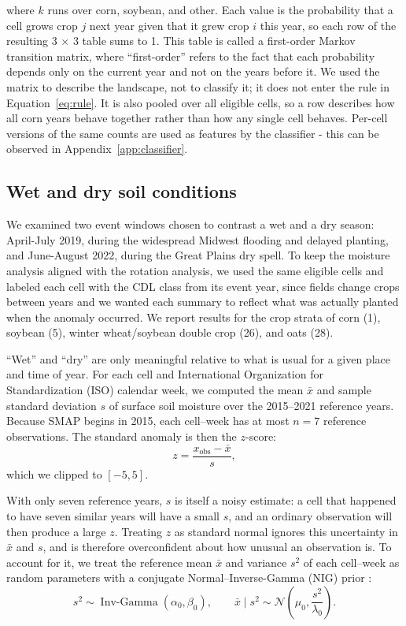 \documentclass[10pt,letterpaper]{article}
\begin{document}
where $k$ runs over corn, soybean, and other. Each value is the probability that a cell grows crop $j$ next year given that it grew crop $i$ this year, so each row of the resulting 3 $\times$ 3 table sums to 1. This table is called a first-order Markov transition matrix, where ``first-order'' refers to the fact that each probability depends only on the current year and not on the years before it. We used the matrix to describe the landscape, not to classify it; it does not enter the rule in Equation~\ref{eq:rule}. It is also pooled over all eligible cells, so a row describes how all corn years behave together rather than how any single cell behaves. Per-cell versions of the same counts are used as features by the classifier - this can be observed in Appendix~\ref{app:classifier}.

\subsection{Wet and dry soil conditions}\label{sec:method-moisture}

We examined two event windows chosen to contrast a wet and a dry season: April-July 2019, during the widespread Midwest flooding and delayed planting, and June-August 2022, during the Great Plains dry spell. To keep the moisture analysis aligned with the rotation analysis, we used the same eligible cells and labeled each cell with the CDL class from its event year, since fields change crops between years and we wanted each summary to reflect what was actually planted when the anomaly occurred. We report results for the crop strata of corn (1), soybean (5), winter wheat/soybean double crop (26), and oats (28).

``Wet'' and ``dry'' are only meaningful relative to what is usual for a given place and time of year. For each cell and International Organization for Standardization (ISO) calendar week, we computed the mean $\bar{x}$ and sample standard deviation $s$ of surface soil moisture over the 2015--2021 reference years. Because SMAP begins in 2015, each cell--week has at most $n=7$ reference observations. The standard anomaly is then the $z$-score:
\begin{equation}
z=\frac{x_{\mathrm{obs}}-\bar{x}}{s},
\label{eq:z}
\end{equation}
which we clipped to $[-5,5]$.

With only seven reference years, $s$ is itself a noisy estimate: a cell that happened to have seven similar years will have a small $s$, and an ordinary observation will then produce a large $z$. Treating $z$ as standard normal ignores this uncertainty in $\bar{x}$ and $s$, and is therefore overconfident about how unusual an observation is. To account for it, we treat the reference mean $\bar{x}$ and variance $s^2$ of each cell--week as random parameters with a conjugate Normal--Inverse-Gamma (NIG) prior \citep{murphy2007conjugate}:
\begin{equation}
s^2\sim\operatorname{Inv\text{-}Gamma}(\alpha_0,\beta_0),\qquad \bar{x}\mid s^2\sim\mathcal{N}\!\left(\mu_0,\frac{s^2}{\lambda_0}\right).
\label{eq:nig}
\end{equation}
\end{document}
